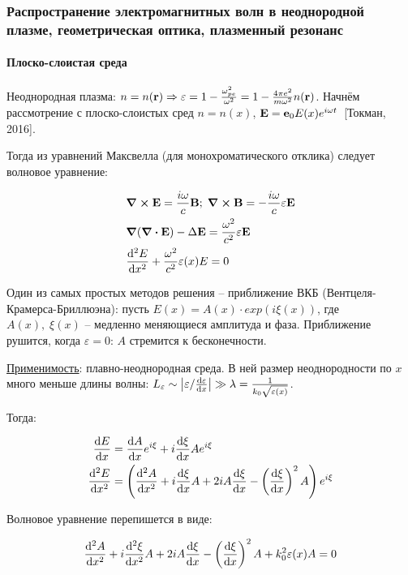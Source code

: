 \documentclass[10pt, a4paper]{article}
\newcommand{\Tokman}{~[Токман, 2016]}
\begin{document}
\subsubsection{Распространение электромагнитных волн в неоднородной плазме, геометрическая оптика, плазменный резонанс}

\paragraph{Плоско-слоистая среда}

Неоднородная плазма: $n = n(\vb{r})\Rightarrow\varepsilon = 1-\frac{\omega_{pe}^2}{\omega^2} = 1-\frac{4\pi e^2}{m\omega^2}n(\vb{r})$. Начнём рассмотрение с плоско-слоистых сред $n = n(x)$, $\vb{E} = \vb{e}_0E(x)e^{i\omega t}$\Tokman.

Тогда из уравнений Максвелла (для монохроматического отклика) следует волновое уравнение:

\begin{align*}
	&\curl{\vb{E}} = \frac{i\omega}{c}\vb{B};\;\curl{\vb{B}} = -\frac{i\omega}{c}\vb{\varepsilon\vb{E}}\\
	&\grad{(\div{\vb{E}})}-\Delta \vb{E} = \frac{\omega^2}{c^2}\varepsilon\vb{E}\\
	&\dv[2]{E}{x} + \frac{\omega^2}{c^2} \varepsilon(x) E = 0	
\end{align*}

Один из самых простых методов решения -- приближение ВКБ (Вентцеля-Крамерса-Бриллюэна): пусть $E(x) = A(x)\cdot exp(i \xi(x))$, где $A(x),\;\xi(x)$ -- медленно меняющиеся амплитуда и фаза. Приближение рушится, когда $\varepsilon = 0$: $A$ стремится к бесконечности.

\uline{Применимость}: плавно-неоднородная среда. В ней размер неоднородности по $x$ много меньше длины волны: $L_{\varepsilon} \sim \abs{\varepsilon/\dv{\varepsilon}{x}} \gg \lambda = \frac{1}{k_0 \sqrt{\varepsilon(x)}}$.

Тогда:

\begin{align*}
	\dv{E}{x} &= \dv{A}{x} e^{i \xi} + i \dv{\xi}{x} Ae^{i\xi} \\
	\dv[2]{E}{x} &= \left(\dv[2]{A}{x} + i\dv{\xi}{x}A + 2iA\dv{\xi}{x} - \left(\dv{\xi}{x}\right)^2A\right)e^{i\xi}
\end{align*}

Волновое уравнение перепишется в виде:

\begin{equation*}
	\dv[2]{A}{x} + i\dv[2]{\xi}{x}A + 2iA\dv{\xi}{x} - \left(\dv{\xi}{x}\right)^2A + k_0^2\varepsilon(x)A = 0
\end{equation*}
\end{document}
